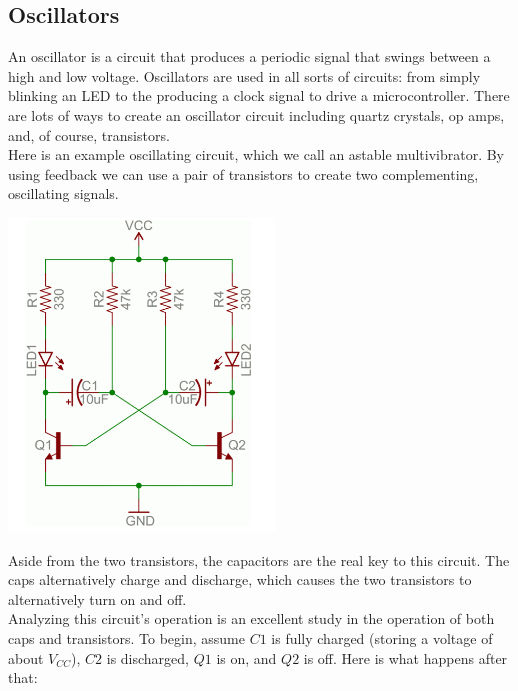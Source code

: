 \documentclass[a4paper, 11pt]{article} %
\begin{document}
\subsection*{Oscillators}

An oscillator is a circuit that produces a periodic signal that swings between a high and low voltage. Oscillators are used in all sorts of circuits: from simply blinking an LED to the producing a clock signal to drive a microcontroller. There are lots of ways to create an oscillator circuit including quartz crystals, op amps, and, of course, transistors.\\

Here is an example oscillating circuit, which we call an astable multivibrator. By using feedback we can use a pair of transistors to create two complementing, oscillating signals.

\begin{center}
\includegraphics[width=200pt]{tran21}
\end{center}

Aside from the two transistors, the capacitors are the real key to this circuit. The caps alternatively charge and discharge, which causes the two transistors to alternatively turn on and off.\\

Analyzing this circuit's operation is an excellent study in the operation of both caps and transistors. To begin, assume $C1$ is fully charged (storing a voltage of about $V_{CC}$), $C2$ is discharged, $Q1$ is on, and $Q2$ is off. Here is what happens after that:
\end{document}
